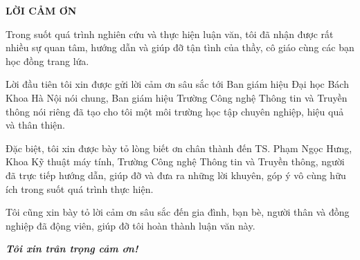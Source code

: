 \documentclass[../LuanVan.tex]{subfiles}
\begin{document}
\begin{center}
    \Large{\textbf{LỜI CẢM ƠN}}
\end{center}
\vspace{1cm}

Trong suốt quá trình nghiên cứu và thực hiện luận văn, tôi đã nhận được rất nhiều sự quan tâm, hướng dẫn và giúp đỡ tận tình của thầy, cô giáo cùng các bạn học đồng trang lứa.

Lời đầu tiên tôi xin được gửi lời cảm ơn sâu sắc tới Ban giám hiệu Đại học Bách Khoa Hà Nội nói chung, Ban giám hiệu Trường Công nghệ Thông tin và Truyền thông nói riêng đã tạo cho tôi một môi trường học tập chuyên nghiệp, hiệu quả và thân thiện.

Đặc biệt, tôi xin được bày tỏ lòng biết ơn chân thành đến TS. Phạm Ngọc Hưng, Khoa Kỹ thuật máy tính, Trường Công nghệ Thông tin và Truyền thông, người đã trực tiếp hướng dẫn, giúp đỡ và đưa ra những lời khuyên, góp ý vô cùng hữu ích trong suốt quá trình thực hiện.

Tôi cũng xin bày tỏ lời cảm ơn sâu sắc đến gia đình, bạn bè, người thân và đồng nghiệp đã động viên, giúp đỡ tôi hoàn thành luận văn này.

\textbf{\textit{Tôi xin trân trọng cảm ơn!}}
\end{document}
